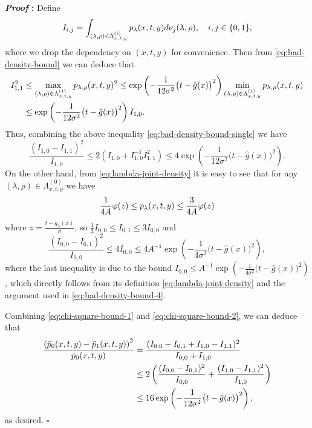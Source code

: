 \documentclass[10pt,a4paper]{amsart}
\newcommand{\dd}{\textup{d}}
\renewenvironment{proof}{\noindent\textbf{\textit{Proof }:}}{\hfill$\square$}
\begin{document}
\begin{proof}
    Define
    \begin{equation}
        \notag
        I_{i,j} = \int_{(\lambda,\rho)\in\Lambda_{x,t,y}^{(i)}} p_{\lambda}(x,t,y) \dd \nu_j(\lambda,\rho),\quad i,j\in\{0,1\},
    \end{equation}
    where we drop the dependency on $(x,t,y)$ for convenience.
    Then from \eqref{eq:bad-density-bound} we can deduce that
    \begin{equation}
        \notag
        \begin{aligned}
            I_{1,1}^2 &\leq \max_{(\lambda,\rho)\in\Lambda_{x,t,y}^{(1)}} p_{\lambda,\rho}(x,t,y)^2 \leq \exp\left(-\frac{1}{12\sigma^2}\big(t-\hat{g}(x)\big)^2\right) \min_{(\lambda,\rho)\in\Lambda_{x,t,y}^{(1)}} p_{\lambda,\rho}(x,t,y) \\
            &\leq \exp\left(-\frac{1}{12\sigma^2}\big(t-\hat{g}(x)\big)^2\right) I_{1,0}.
        \end{aligned}
    \end{equation}
    Thus, combining the above inequality \eqref{eq:bad-density-bound-single} we have
    \begin{equation}
        \label{eq:chi-square-bound-1}
        \frac{(I_{1,0}-I_{1,1})^2}{I_{1,0}} \leq 2\left(I_{1,0}+I_{1,0}^{-1}I_{1,1}^2\right) \leq 4\exp\left(-\frac{1}{12\sigma^2}\big(t-\hat{g}(x)\big)^2\right).
    \end{equation}
    On the other hand, from \eqref{eq:lambda-joint-density} it is easy to see that for any $(\lambda,\rho)\in\Lambda_{x,t,y}^{(0)}$ we have
    \begin{equation}
        \notag
        \frac{1}{4A}\varphi(z) \leq p_{\lambda}(x,t,y) \leq \frac{3}{4A}\varphi(z)
    \end{equation}
    where $z=\frac{t-g_{\lambda}(x)}{\sigma}$, so $\frac{1}{3}I_{0,0}\leq I_{0,1}\leq 3I_{0,0}$ and
    \begin{equation}
        \label{eq:chi-square-bound-2}
        \frac{(I_{0,0}-I_{0,1})^2}{I_{0,0}} \leq 4I_{0,0} \leq 4A^{-1}\exp\left(-\frac{1}{4\sigma^2}\big(t-\hat{g}(x)\big)^2\right),
    \end{equation}
    where the last inequality is due to the bound $I_{0,0}\leq A^{-1}\exp\left(-\frac{1}{4\sigma^2}\big(t-\hat{g}(x)\big)^2\right)$, which directly follows from its definition \eqref{eq:lambda-joint-density} and the argument used in \eqref{eq:bad-density-bound-4}.
    
    Combining \eqref{eq:chi-square-bound-1} and \eqref{eq:chi-square-bound-2}, we can deduce that
    \begin{equation}
        \notag
        \begin{aligned}
            \frac{\left(\bar{p}_0(x,t,y)-\bar{p}_1(x,t,y)\right)^2}{\bar{p}_0(x,t,y)} &= \frac{(I_{0,0}-I_{0,1}+I_{1,0}-I_{1,1})^2}{I_{0,0}+I_{1,0}} \\
            &\leq 2 \left( \frac{(I_{0,0}-I_{0,1})^2}{I_{0,0}} + \frac{(I_{1,0}-I_{1,1})^2}{I_{1,0}} \right) \\
            &\leq 16\exp\left(-\frac{1}{12\sigma^2}\big(t-\hat{g}(x)\big)^2\right),
        \end{aligned}
    \end{equation}
    as desired.
\end{proof}
\end{document}
